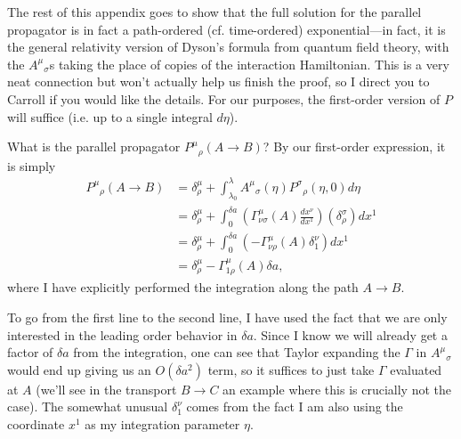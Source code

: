 The rest of this appendix goes to show that the full solution for the parallel propagator is in fact a path-ordered (cf. time-ordered) exponential---in fact, it is the general relativity version of Dyson's formula from quantum field theory, with the ${A^\mu}_\sigma$s taking the place of copies of the interaction Hamiltonian. This is a very neat connection but won't actually help us finish the proof, so I direct you to Carroll if you would like the details. For our purposes, the first-order version of $P$ will suffice (i.e. up to a single integral $d\eta$).

What is the parallel propagator ${P^\mu}_\rho(A\to B)$? By our first-order expression, it is simply
\begin{align*}
    {P^\mu}_\rho (A \to B)&= \delta^\mu_\rho+ \int_{\lambda_0}^{\lambda} {A^\mu}_\sigma(\eta){P^\sigma}_\rho(\eta,0)d\eta\\
        &= \delta^\mu_\rho+ \int_{0}^{\delta a} \left(\Gamma^\mu_{\nu \sigma}(A) \frac{dx^\nu}{dx^1}\right) (\delta^\sigma_\rho) dx^1\\
        &=\delta^\mu_\rho +\int_0^{\delta a}(-\Gamma^\mu_{\nu \rho}(A) \delta^\nu_1) dx^1\\
        &=\delta^\mu_\rho -\Gamma^\mu_{1\rho}(A) \delta a,
\end{align*}
where I have explicitly performed the integration along the path $A\to B$. 

To go from the first line to the second line, I have used the fact that we are only interested in the leading order behavior in $\delta a$. Since I know we will already get a factor of $\delta a$ from the integration, one can see that Taylor expanding the $\Gamma$ in ${A^\mu}_\sigma$ would end up giving us an $O(\delta a^2)$ term, so it suffices to just take $\Gamma$ evaluated at $A$ (we'll see in the transport $B\to C$ an example where this is crucially not the case). The somewhat unusual $\delta^\nu_1$ comes from the fact I am also using the coordinate $x^1$ as my integration parameter $\eta$.

